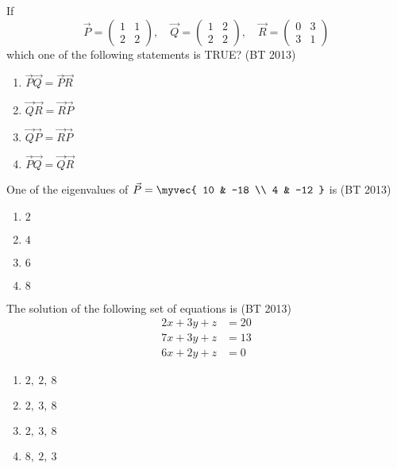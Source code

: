 \item 
If 
\[
\vec{P} = \begin{pmatrix}
1 & 1 \\
2 & 2
\end{pmatrix},
\quad
\vec{Q} = \begin{pmatrix}
1 & 2 \\
2 & 2
\end{pmatrix},
\quad
\vec{R} = \begin{pmatrix}
0 & 3 \\
3 & 1
\end{pmatrix}
\]
which one of the following statements is TRUE?
\hfill (BT 2013)
\begin{multicols}{4}
\begin{enumerate}
    \item $\vec{P}\vec{Q} = \vec{P}\vec{R}$
    \item $\vec{Q}\vec{R} = \vec{R}\vec{P}$
    \item $\vec{Q}\vec{P} = \vec{R}\vec{P}$
    \item $\vec{P}\vec{Q} = \vec{Q}\vec{R}$
\end{enumerate}
\end{multicols}
\item 
One of the eigenvalues of 
$
\vec{P} = \myvec{
10 & -18 \\
4 & -12
}
$
is
\hfill (BT 2013)
\begin{multicols}{4}
\begin{enumerate}
    \item $2$
    \item $4$
    \item $6$
    \item $8$
\end{enumerate} 
\end{multicols}
\item 
The solution of the following set of equations is
\hfill(BT 2013)
\begin{align*}
2x + 3y + z &= 20 \\
7x + 3y + z &= 13 \\
6x + 2y + z &= 0
\end{align*}
\begin{multicols}{4}
\begin{enumerate}
    \item $2,\ 2,\ 8$
    \item $2,\ 3,\ 8$
    \item $2,\ 3,\ 8$
    \item $8,\ 2,\ 3$
\end{enumerate} 
\end{multicols}

